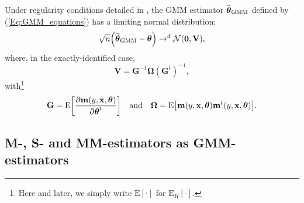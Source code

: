 Under regularity conditions detailed in \citet{Hansen:1982}, the GMM
estimator $\widehat{\boldsymbol{\theta}}_{\mathrm{GMM}}$ defined by
(\ref{Eq:GMM_equations}) has a limiting normal distribution: \
\begin{equation}
\sqrt{n}\left(  \sthat{\boldsymbol{\theta}}_{\mathrm{GMM}}%
-\boldsymbol{\theta}\right)  \rightarrow^{d}\mathcal{N}(\mathbf{0}%
,\mathbf{V}), \label{Eq:GMM_estimator_normality}%
\end{equation}
where, in the exactly-identified case,
\begin{equation}
\mathbf{V}=\mathbf{G}^{-1}\boldsymbol{\Omega}\left(  \mathbf{G}^{t}\right)
^{-1}, \label{Eq:GMM_estimator_V}%
\end{equation}
with\footnote{Here and later, we simply write $\mathrm{E}\left[  \cdot\right]
$ for $\mathrm{E}_{H}\left[  \cdot\right]  $.}
\begin{equation}
\mathbf{G}=\mathrm{E}\left[  \frac{\partial\mathbf{m}\left(  y,\stvec{x}%
,\boldsymbol{\theta}\right)  }{\partial\boldsymbol{\theta}^{t}}\right]
\quad\text{and}\quad\boldsymbol{\Omega}=\mathrm{E}\left[  \mathbf{m}\left(
y,\stvec{x},\boldsymbol{\theta}\right)  \mathbf{m}^{t}\left(  y,\stvec{x}%
,\boldsymbol{\theta}\right)  \right]  . \label{Eq:GMM_estimator_G_Omega}%
\end{equation}


\subsection{M-, S- and MM-estimators as GMM-estimators}

